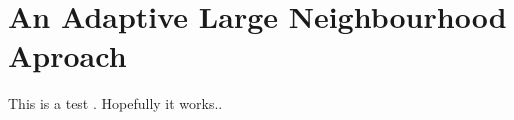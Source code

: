 \documentclass[../main.tex]{subfiles}
\begin{document}
                                                
\chapter{An Adaptive Large Neighbourhood Aproach}                                 
This is a test \cite{shaw97}. Hopefully it works..              
\biblio                                                         
\end{document}
